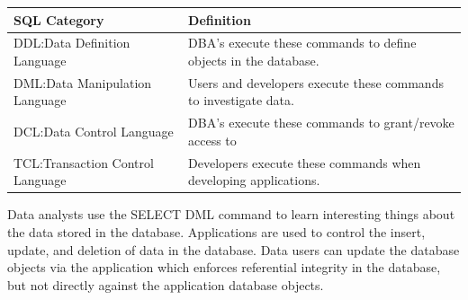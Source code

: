\documentclass[]{book}
\theoremstyle{definition}
\theoremstyle{definition}
\theoremstyle{definition}
\theoremstyle{remark}
\begin{document}
\begin{longtable}[]{@{}ll@{}}
\toprule
\begin{minipage}[b]{0.19\columnwidth}\raggedright
SQL Category\strut
\end{minipage} & \begin{minipage}[b]{0.75\columnwidth}\raggedright
Definition\strut
\end{minipage}\tabularnewline
\midrule
\endhead
\begin{minipage}[t]{0.19\columnwidth}\raggedright
DDL:Data Definition Language\strut
\end{minipage} & \begin{minipage}[t]{0.75\columnwidth}\raggedright
DBA's execute these commands to define objects in the database.\strut
\end{minipage}\tabularnewline
\begin{minipage}[t]{0.19\columnwidth}\raggedright
DML:Data Manipulation Language\strut
\end{minipage} & \begin{minipage}[t]{0.75\columnwidth}\raggedright
Users and developers execute these commands to investigate data.\strut
\end{minipage}\tabularnewline
\begin{minipage}[t]{0.19\columnwidth}\raggedright
DCL:Data Control Language\strut
\end{minipage} & \begin{minipage}[t]{0.75\columnwidth}\raggedright
DBA's execute these commands to grant/revoke access to\strut
\end{minipage}\tabularnewline
\begin{minipage}[t]{0.19\columnwidth}\raggedright
TCL:Transaction Control Language\strut
\end{minipage} & \begin{minipage}[t]{0.75\columnwidth}\raggedright
Developers execute these commands when developing applications.\strut
\end{minipage}\tabularnewline
\bottomrule
\end{longtable}

Data analysts use the SELECT DML command to learn interesting things
about the data stored in the database. Applications are used to control
the insert, update, and deletion of data in the database. Data users can
update the database objects via the application which enforces
referential integrity in the database, but not directly against the
application database objects.
\end{document}
